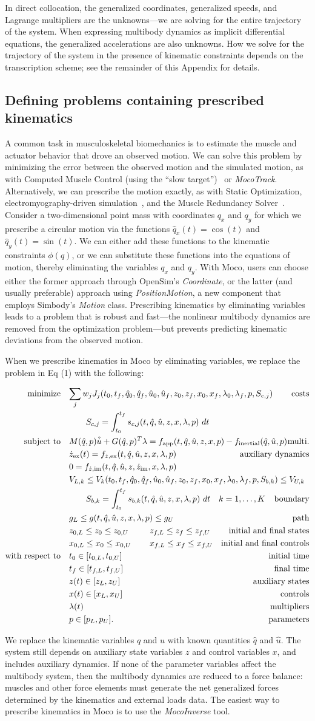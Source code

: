 \documentclass[10pt,letterpaper]{article}
\newcommand{\prescribed}{
\begin{align}
    \begin{aligned}
        \mbox{minimize} \quad & \mathrlap{\sum_j w_j J_{j}(t_0, t_f, \hat{q}_0, \hat{q}_f, \hat{u}_0, \hat{u}_f, z_0, z_f, x_{0}, x_{f}, \lambda_0, \lambda_f, p, S_{c,j})} &&& \textrm{costs} \\
        & \quad\quad \mathrlap{S_{c,j} = \int_{t_0}^{t_f} s_{c,j}(t, \hat{q}, \hat{u}, z, x, \lambda, p)~dt} \\
        \mbox{subject to} \quad &
         M(\hat{q}, p)\hat{\dot{u}} + \mathrlap{G(\hat{q}, p)^T \lambda = f_{\textrm{app}}(t, \hat{q}, \hat{u}, z, x, p) - f_{\textrm{inertial}}(\hat{q}, \hat{u}, p)} &&& \textrm{multi.} \\
        & \mathrlap{\dot{z}_{\textrm{ex}}(t) = f_{\dot{z},\textrm{ex}}(t, \hat{q}, \hat{u}, z, x, \lambda, p)} &&& \textrm{auxiliary dynamics} \\
        & \mathrlap{0 = f_{\dot{z},\textrm{im}}(t, \hat{q}, \hat{u}, z, \dot{z}_\textrm{im}, x, \lambda, p)} \\
        & V_{L,k} \leq V_k(t_0, t_f, \hat{q}_0, \mathrlap{\hat{q}_f, \hat{u}_0, \hat{u}_f, z_0, z_f, x_{0}, x_{f}, \lambda_0, \lambda_f, p, S_{b,k}) \leq V_{U,k}} \\
        & \quad\quad \mathrlap{S_{b,k} = \int_{t_0}^{t_f} s_{b,k}(t, \hat{q}, \hat{u}, z, x, \lambda, p)~dt \quad k = 1, \ldots, K} &&& \textrm{boundary} \\
        & \mathrlap{g_{L} \leq g(t, \hat{q}, \hat{u}, z, x, \lambda, p) \leq g_{U}} &&& \textrm{path} \\
        & z_{0,L} \leq z_0 \leq z_{0,U} && z_{f,L} \leq z_f \leq z_{f,U} & \textrm{initial and final states} \\
        & x_{0,L} \leq x_0 \leq x_{0,U} && x_{f,L} \leq x_f \leq x_{f,U} & \textrm{initial and final controls} \\
        \mbox{with respect to} \quad
        & t_0 \in [t_{0,L}, t_{0,U}] &&& \textrm{initial time} \\
        & t_f \in [t_{f,L}, t_{f,U}] &&& \textrm{final time} \\
        & z(t) \in [z_{L}, z_{U}] &&& \textrm{auxiliary states} \\
        & x(t) \in [x_{L}, x_{U}] &&& \textrm{controls} \\
        & \lambda(t) &&& \textrm{multipliers} \\
        & p \in [p_{L}, p_{U}]. &&& \textrm{parameters}
    \end{aligned}
\end{align}
}
\begin{document}
In direct collocation, the generalized coordinates, generalized speeds, and Lagrange multipliers are the unknowns—we are solving for the entire trajectory of the system. When expressing multibody dynamics as implicit differential equations, the generalized accelerations are also unknowns. How we solve for the trajectory of the system in the presence of kinematic constraints depends on the transcription scheme; see the remainder of this Appendix for details.

\subsection*{Defining problems containing prescribed kinematics}

A common task in musculoskeletal biomechanics is to estimate the muscle and actuator behavior that drove an observed motion. We can solve this problem by minimizing the error between the observed motion and the simulated motion, as with Computed Muscle Control (using the ``slow target'')~\cite{Thelen:2003bba} or \textit{MocoTrack}. Alternatively, we can prescribe the motion exactly, as with Static Optimization, electromyography-driven simulation~\cite{Lloyd:2003}, and the Muscle Redundancy Solver~\cite{Groote:2016dq}. Consider a two-dimensional point mass with coordinates $q_x$ and $q_y$ for which we prescribe a circular motion via the functions $\hat{q}_x(t) = \cos(t)$ and $\hat{q}_y(t) = \sin(t)$. We can either add these functions to the kinematic constraints $\phi(q)$, or we can substitute these functions into the equations of motion, thereby eliminating the variables $q_x$ and $q_y$. With Moco, users can choose either the former approach through OpenSim's \textit{Coordinate}, or the latter (and usually preferable) approach using \textit{PositionMotion}, a new component that employs Simbody's \textit{Motion} class. Prescribing kinematics by eliminating variables leads to a problem that is robust and fast---the nonlinear multibody dynamics are removed from the optimization problem---but prevents predicting kinematic deviations from the observed motion.

When we prescribe kinematics in Moco by eliminating variables, we replace the problem in Eq (1) with the following:

\prescribed

We replace the kinematic variables $q$ and $u$ with known quantities $\hat{q}$ and $\hat{u}$. The system still depends on auxiliary state variables $z$ and control variables $x$, and includes auxiliary dynamics. If none of the parameter variables affect the multibody system, then the multibody dynamics are reduced to a force balance: muscles and other force elements must generate the net generalized forces determined by the kinematics and external loads data. The easiest way to prescribe kinematics in Moco is to use the \textit{MocoInverse} tool.
\end{document}
